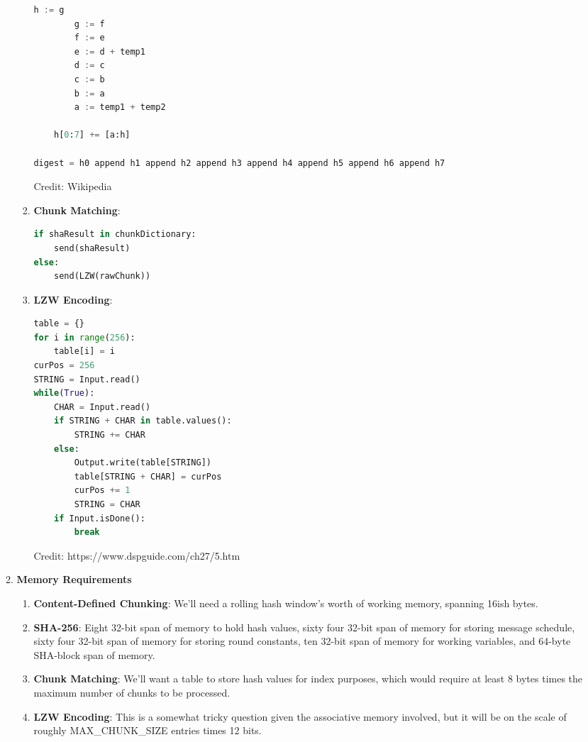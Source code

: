 \documentclass{article}
\begin{document}
\begin{enumerate}
\begin{enumerate}[label=(\alph*)]
\begin{enumerate}[label=(\roman*)]
\begin{lstlisting}[language=python]
        h := g
        g := f
        f := e
        e := d + temp1
        d := c
        c := b
        b := a
        a := temp1 + temp2
    
    h[0:7] += [a:h]
    
digest = h0 append h1 append h2 append h3 append h4 append h5 append h6 append h7

\end{lstlisting}
Credit: Wikipedia
\item%
\textbf{Chunk Matching}:
\begin{lstlisting}[language=python]
if shaResult in chunkDictionary:
    send(shaResult)
else:
    send(LZW(rawChunk))
\end{lstlisting}
\item%
\textbf{LZW Encoding}:
\begin{lstlisting}[language=python]
table = {}
for i in range(256):
    table[i] = i
curPos = 256
STRING = Input.read()
while(True):
    CHAR = Input.read()
    if STRING + CHAR in table.values():
        STRING += CHAR
    else:
        Output.write(table[STRING])
        table[STRING + CHAR] = curPos
        curPos += 1
        STRING = CHAR
    if Input.isDone():
        break
\end{lstlisting}
Credit: https://www.dspguide.com/ch27/5.htm
\end{enumerate}%
\item%
\textbf{Memory Requirements}
\begin{enumerate}[label=(\roman*)]
\item%
\textbf{Content-Defined Chunking}:\newline
We'll need a rolling hash window's worth of working memory, spanning 16ish bytes.

\item%
\textbf{SHA-256}:\newline
Eight 32-bit span of memory to hold hash values, 
sixty four 32-bit span of memory for storing message schedule,
sixty four 32-bit span of memory for storing round constants,
ten 32-bit span of memory for working variables, and
64-byte SHA-block span of memory.

\item%
\textbf{Chunk Matching}:\newline
We'll want a table to store hash values for index purposes, which would require at least 8 bytes times the maximum number of chunks to be processed.

\item%
\textbf{LZW Encoding}:\newline
This is a somewhat tricky question given the associative memory involved, but it will be on the scale of roughly MAX\_CHUNK\_SIZE entries times 12 bits.


\end{enumerate}
\end{enumerate}
\end{enumerate}
\end{document}
